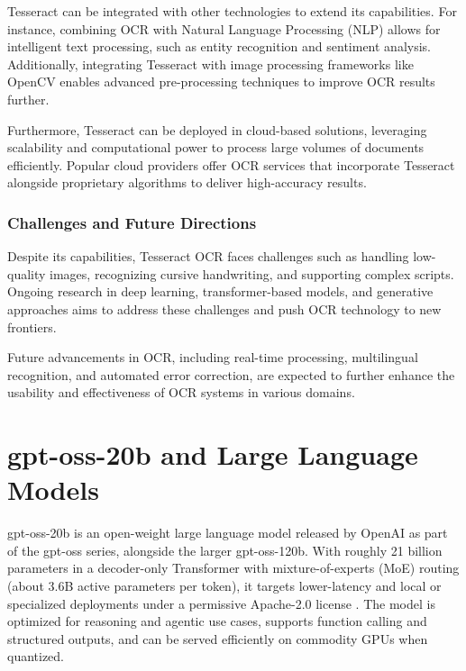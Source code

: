 Tesseract can be integrated with other technologies to extend its capabilities. For instance, combining OCR with Natural Language Processing (NLP) allows for intelligent text processing, such as entity recognition and sentiment analysis. Additionally, integrating Tesseract with image processing frameworks like OpenCV enables advanced pre-processing techniques to improve OCR results further.

Furthermore, Tesseract can be deployed in cloud-based solutions, leveraging scalability and computational power to process large volumes of documents efficiently. Popular cloud providers offer OCR services that incorporate Tesseract alongside proprietary algorithms to deliver high-accuracy results.

\subsubsection{Challenges and Future Directions}

Despite its capabilities, Tesseract OCR faces challenges such as handling low-quality images, recognizing cursive handwriting, and supporting complex scripts. Ongoing research in deep learning, transformer-based models, and generative approaches aims to address these challenges and push OCR technology to new frontiers.

Future advancements in OCR, including real-time processing, multilingual recognition, and automated error correction, are expected to further enhance the usability and effectiveness of OCR systems in various domains.





\section{gpt-oss-20b and Large Language Models}

gpt-oss-20b is an open-weight large language model released by OpenAI as part of the gpt-oss series, alongside the larger gpt-oss-120b. With roughly 21 billion parameters in a decoder-only Transformer with mixture-of-experts (MoE) routing (about 3.6B active parameters per token), it targets lower-latency and local or specialized deployments under a permissive Apache-2.0 license \cite{openai2025gptoss}. The model is optimized for reasoning and agentic use cases, supports function calling and structured outputs, and can be served efficiently on commodity GPUs when quantized.

